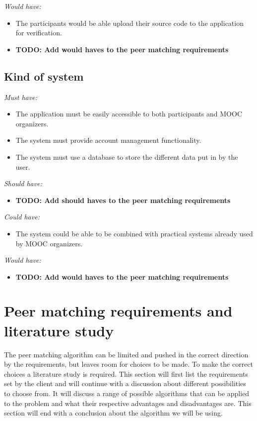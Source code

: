 \documentclass[]{article}
\newcommand{\TODO}[1]{{\color{red}\textbf{TODO: #1}}}
\newcommand{\reqr}[1]{{\noindent\emph{#1:}}}
\begin{document}
\reqr{Would have}
\begin{itemize}
\item The participants would be able upload their source code to the application for verification.
\item \TODO{Add would haves to the peer matching requirements}
\end{itemize}

\subsection{Kind of system}

\reqr{Must have}
\begin{itemize}
\item The application must be easily accessible to both participants and MOOC organizers.
\item The system must provide account management functionality.
\item The system must use a database to store the different data put in by the user.
\end{itemize}

\reqr{Should have}
\begin{itemize}
\item \TODO{Add should haves to the peer matching requirements}
\end{itemize}

\reqr{Could have}
\begin{itemize}
\item The system could be able to be combined with practical systems already used by MOOC organizers.
\end{itemize}

\reqr{Would have}
\begin{itemize}
\item \TODO{Add would haves to the peer matching requirements}
\end{itemize}

\section{Peer matching requirements and literature study}
The peer matching algorithm can be limited and pushed in the correct direction by the requirements, but leaves room for choices to be made.
To make the correct choices a literature study is required.
This section will first list the requirements set by the client and will continue with a discussion about different possibilities to choose from.
It will discuss a range of possible algorithms that can be applied to the problem and what their respective advantages and disadvantages are.
This section will end with a conclusion about the algorithm we will be using.
\end{document}
